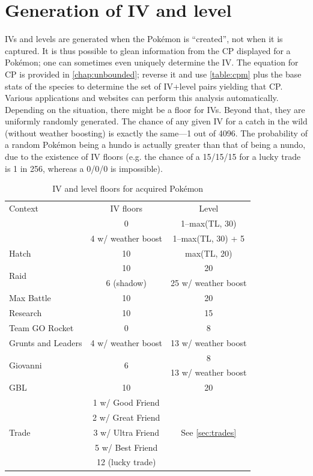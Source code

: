 \section{Generation of IV and level\label{sec:ivgeneration}}
IVs and levels are generated when the Pokémon is ``created'', not when it is captured.
It is thus possible to glean information from the CP displayed for a Pokémon;
  one can sometimes even uniquely determine the IV\@.
The equation for CP is provided in \autoref{chap:unbounded}; reverse it and
  use \autoref{table:cpm} plus the base stats of the species to determine
  the set of IV+level pairs yielding that CP\@.
Various applications and websites can perform this analysis automatically.
Depending on the situation, there might be a floor for IVs.
Beyond that, they are uniformly randomly generated.
The chance of any given IV for a catch in the wild (without weather boosting)
  is exactly the same---1 out of 4096.
The probability of a random Pokémon being a hundo is actually
  greater than that of being a nundo, due to the existence of IV floors
  (e.g. the chance of a 15/15/15 for a lucky trade is 1 in 256, whereas
  a 0/0/0 is impossible).
\begin{table}
\centering
\begin{tabular}{lcc}
Context & IV floors & Level \\
\Midrule
\multirow{2}{*}{Wild catch} & 0 & 1--max(TL, 30) \\
& 4 w/ weather boost & 1--max(TL, 30) + 5 \\
Hatch & 10 & max(TL, 20) \\
\multirow{2}{*}{Raid} & 10 & 20 \\
& 6 (shadow) & 25 w/ weather boost \\
Max Battle & 10 & 20 \\
Research & 10 & 15 \\
Team GO Rocket & 0 & 8 \\
Grunts and Leaders & 4 w/ weather boost & 13 w/ weather boost \\
\multirow{2}{*}{Giovanni} & \multirow{2}{*}{6} & 8\\
& & 13 w/ weather boost\\
GBL & 10 & 20\\
\multirow{5}{*}{Trade} & 1 w/ Good Friend & \multirow{5}{*}{See \autoref{sec:trades}} \\
& 2 w/ Great Friend & \\
& 3 w/ Ultra Friend & \\
& 5 w/ Best Friend & \\
& 12 (lucky trade) & \\
\end{tabular}
\caption{IV and level floors for acquired Pokémon\label{table:ivfloors}}
\end{table}

